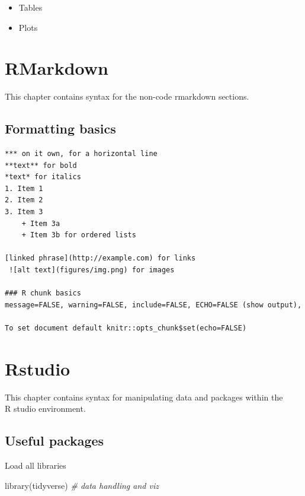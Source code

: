 \documentclass[
]{article}
\newenvironment{Shaded}{\begin{snugshade}}{\end{snugshade}}
\newcommand{\CommentTok}[1]{\textcolor[rgb]{0.56,0.35,0.01}{\textit{#1}}}
\newcommand{\FunctionTok}[1]{\textcolor[rgb]{0.00,0.00,0.00}{#1}}
\newcommand{\NormalTok}[1]{#1}
\providecommand{\tightlist}{%
  \setlength{\itemsep}{0pt}\setlength{\parskip}{0pt}}
\begin{document}
\begin{itemize}
  \begin{itemize}
  \tightlist
  \item
    Tables
  \item
    Plots
  \end{itemize}
\end{itemize}

\hypertarget{rmarkdown}{%
\section{RMarkdown}\label{rmarkdown}}

This chapter contains syntax for the non-code rmarkdown sections.

\hypertarget{formatting-basics}{%
\subsection{Formatting basics}\label{formatting-basics}}

\begin{verbatim}
*** on it own, for a horizontal line
**text** for bold
*text* for italics
1. Item 1
2. Item 2
3. Item 3
    + Item 3a
    + Item 3b for ordered lists
    
[linked phrase](http://example.com) for links
 ![alt text](figures/img.png) for images

### R chunk basics 
message=FALSE, warning=FALSE, include=FALSE, ECHO=FALSE (show output), 

To set document default knitr::opts_chunk$set(echo=FALSE) 
\end{verbatim}

\hypertarget{rstudio}{%
\section{Rstudio}\label{rstudio}}

This chapter contains syntax for manipulating data and packages within the\\
R studio environment.

\hypertarget{useful-packages}{%
\subsection{Useful packages}\label{useful-packages}}

Load all libraries

\begin{Shaded}
\begin{Highlighting}[]
\FunctionTok{library}\NormalTok{(tidyverse) }\CommentTok{\# data handling and viz}
\end{Highlighting}
\end{Shaded}
\end{document}
